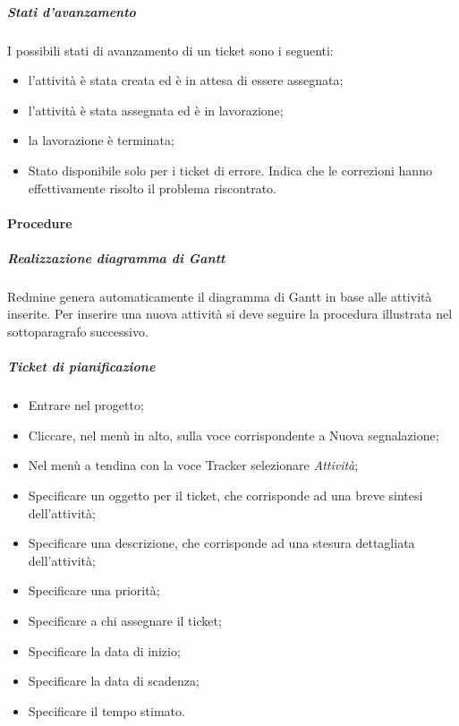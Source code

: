 \subparagraph{Stati d'avanzamento}


I possibili stati di avanzamento di un ticket sono i seguenti:
\begin{itemize}
\item {} l'attività è stata creata ed è in attesa di essere assegnata;
\item {} l'attività è stata assegnata ed è in lavorazione;
\item {} la lavorazione è terminata;
\item {} Stato disponibile solo per i ticket di errore. Indica che le correzioni hanno effettivamente risolto il problema riscontrato.

\end{itemize}


\paragraph{Procedure}
\label{2}
\subparagraph{Realizzazione diagramma di Gantt}
\label{1}
Redmine genera automaticamente il diagramma di Gantt in base alle attività inserite.
Per inserire una nuova attività si deve seguire la procedura illustrata nel sottoparagrafo successivo.

\subparagraph{Ticket di pianificazione}
\begin{itemize}
\item Entrare nel progetto;
\item Cliccare, nel menù in alto, sulla voce corrispondente a Nuova segnalazione;
\item Nel menù a tendina con la voce Tracker selezionare \textit{Attività};
\item Specificare un oggetto per il ticket, che corrisponde ad una breve sintesi dell'attività;
\item Specificare una descrizione, che corrisponde ad una stesura dettagliata dell'attività;
\item Specificare una priorità;
\item Specificare a chi assegnare il ticket;
\item Specificare la data di inizio;
\item Specificare la data di scadenza;
\item Specificare il tempo stimato.
\end{itemize}

